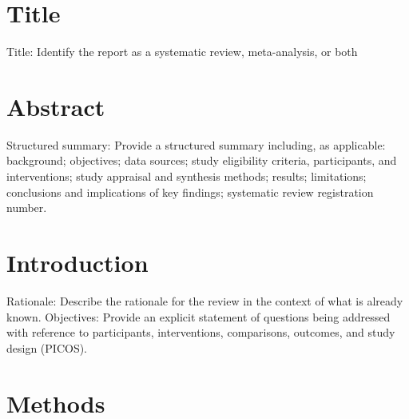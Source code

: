 \documentclass{article}\usepackage[]{graphicx}\usepackage[]{color}
\begin{document}
\section{Title}


Title: Identify the report as a systematic review, meta-analysis, or both

\section{Abstract}

Structured summary: Provide a structured summary including, as applicable: background; objectives; data sources; study eligibility criteria, participants, and interventions; study appraisal and synthesis methods; results; limitations; conclusions and implications of key findings; systematic review registration number.

\section{Introduction}

Rationale: Describe the rationale for the review in the context of what is already known. Objectives: Provide an explicit statement of questions being addressed with reference to participants, interventions, comparisons, outcomes, and study design (PICOS).

\section{Methods}
\end{document}
